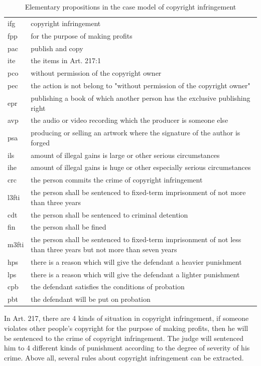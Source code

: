 \documentclass{IOS-Book-Article}
\begin{document}
\footnotesize
\begin{table}[htbp]
\caption{Elementary propositions in the case model of copyright infringement}
\centering
\begin{tabularx}{120mm}{>{\hsize=0.2\hsize}X>{\hsize=1.6\hsize}X}
\hline
ifg & copyright infringement\\
fpp & for the purpose of making profits\\
pac & publish and copy\\
ite & the items in Art. 217:1\\
pco & without permission of the copyright owner\\
pec & the action is not belong to "without permission of the copyright owner"\\
epr & publishing a book of which another person has the exclusive publishing right\\
avp & the audio or video recording which the producer is someone else\\
psa & producing or selling an artwork where the signature of the author is forged\\
ils & amount of illegal gains is large or other serious circumstances\\
ihe & amount of illegal gains is huge or other especially serious circumstances\\
crc & the person commits the crime of copyright infringement\\
l3fti & the person shall be sentenced to fixed-term imprisonment of not more than three years\\
cdt & the person shall be sentenced to criminal detention\\
fin & the person shall be fined\\
m3fti & the person shall be sentenced to fixed-term imprisonment of not less than three years but not more than seven years\\
hps & there is a reason which will give the defendant a heavier punishment\\
lps & there is a reason which will give the defendant a lighter punishment\\
cpb & the defendant satisfies the conditions of probation\\
pbt & the defendant will be put on probation\\
\hline
\end{tabularx}
\end{table}

\normalsize
In Art. 217, there are 4 kinds of situation in copyright infringement, if someone violates other people's copyright for the purpose of making profits, then he will be sentenced to the crime of copyright infringement. The judge will sentenced him to 4 different kinds of punishment according to the degree of severity of his crime. Above all, several rules about copyright infringement can be extracted.
\end{document}
